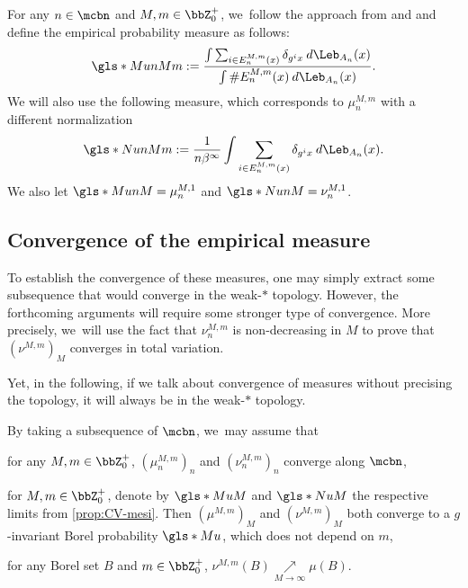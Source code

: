 For any $n \in \mcbn$ and $M,m \in \bbZ_0^+$, we~follow the approach from \cite{BCS_cont} and \cite{burguet2024srbPH} and define the empirical probability measure as follows:
\[
\gls*{MunMm} := \frac{\int \sum_{i \in E_n^{M,m}(x)} \delta_{g^i x} \: d \Leb_{A_n}(x)}{\int \# E_n^{M,m}(x) \: d \Leb_{A_n}(x)}.
\]
We will also use the following measure, which corresponds to $\mu_n^{M,m}$ with a different normalization
\[
\gls*{NunMm} := \frac{1}{n \beta^{\infty}} \int \sum_{i \in E_n^{M,m}(x)} \delta_{g^i x} \: d \Leb_{A_n}(x).
\]
We also let $\gls*{MunM} = \mu_n^{M,1}$ and $\gls*{NunM} = \nu_n^{M,1}$.

\subsection{Convergence of the empirical measure}

To establish the convergence of these measures, one may simply extract some subsequence that would converge in the weak\nobreakdash-$*$ topology.
However, the forthcoming arguments will require some stronger type of convergence.
More precisely, we~will use the fact that $\nu_n^{M,m}$ is non-decreasing in $M$ to prove that $\left (\nu^{M,m} \right)_M$ converges in total variation.

Yet, in the following, if we talk about convergence of measures without precising the topology, it will always be in the weak\nobreakdash-$*$ topology.

\begin{prop}
\label{prop:CV-mes}
By taking a subsequence of $\mcbn$, we~may assume that
\begin{enumeratei}
\item\label{prop:CV-mesi}
 for any $M,m \in \bbZ_0^+$, $(\mu_n^{M,m})_n$ and $(\nu_n^{M,m})_n$ converge along $\mcbn$,
\item\label{prop:CV-mesii}
 for $M,m \in \bbZ_0^+$, denote by
$\gls*{MuM}$ and
$\gls*{NuM}$ the respective limits from \eqref{prop:CV-mesi}. Then $(\mu^{M,m})_M$ and $(\nu^{M,m})_M$ both converge to a $g$-invariant Borel probability
$\gls*{Mu}$, which does not depend on $m$,
\item\label{prop:CV-mesiii}
 for any Borel set $B$ and $m \in \bbZ_0^+$, $\nu^{M,m}(B) \underset{M \to \infty}{\nearrow} \mu(B)$.
\end{enumeratei}
\end{prop}


